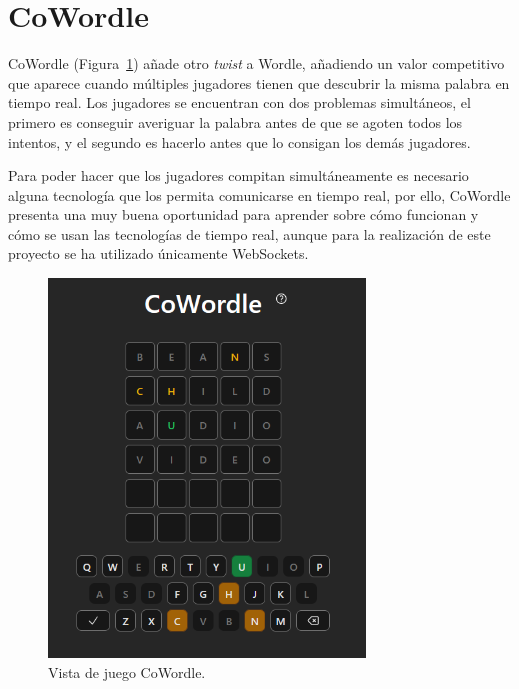 \section{CoWordle}

CoWordle (Figura~\ref{fig:cowordle_app}) añade otro \textit{twist} a Wordle, añadiendo un valor competitivo que aparece cuando múltiples jugadores tienen que descubrir la misma palabra en tiempo real. Los jugadores se encuentran con dos problemas simultáneos, el primero es conseguir averiguar la palabra antes de que se agoten todos los intentos, y el segundo es hacerlo antes que lo consigan los demás jugadores.

Para poder hacer que los jugadores compitan simultáneamente es necesario alguna tecnología que los permita comunicarse en tiempo real, por ello, CoWordle presenta una muy buena oportunidad para aprender sobre cómo funcionan y cómo se usan las tecnologías de tiempo real, aunque para la realización de este proyecto se ha utilizado únicamente WebSockets.

\begin{figure}
	\centering
	\includegraphics[clip=true, width=0.75\textwidth]{images/cowordle_app.png}
	\caption{Vista de juego CoWordle.}
	\label{fig:cowordle_app}
\end{figure}
